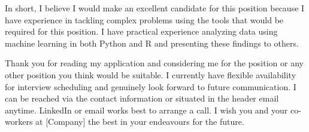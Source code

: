 \documentclass[11pt, a4paper]{awesome-cv}
\begin{document}
\begin{cvletter}
  In short, I believe I would make an excellent candidate for this position
  because I have experience in tackling complex problems using the tools that
  would be required for this position. I have practical experience analyzing
  data using machine learning in both Python and R and presenting these findings
  to others.

  Thank you for reading my application and considering me for the position or
  any other position you think would be suitable. I currently have flexible
  availability for interview scheduling and genuinely look forward to future
  communication. I can be reached via the contact information or situated in the
  header email anytime. LinkedIn or email works best to arrange a call. I wish
  you and your co-workers at [Company] the best in your endeavours for the future.


\end{cvletter}

\makeletterclosing
\end{document}
